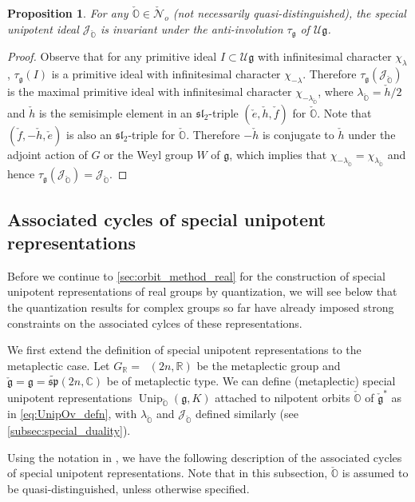 \documentclass[11pt, a4paper]{amsart}
\newcommand{\C}{\mathbb{C}}
\newcommand{\J}{\mathcal{J}}
\newcommand{\g}{\mathfrak{g}}
\newcommand{\orb}{\mathbb{O}}
\newcommand{\fg}{\mathfrak{g}}
\newcommand{\ckfg}{{\check{\fg}}}
\newcommand{\ckorb}{\check{\orb}}
\newcommand{\fmp}{\widetilde{\mathfrak{sp}}}
\newcommand{\cN}{\mathcal{N}}
\newcommand{\cJ}{\mathcal{J}}
\newcommand{\cU}{\mathcal{U}}
\newcommand{\Ug}{\cU\fg}
\DeclareMathOperator{\Unip}{Unip}
\DeclareMathOperator{\Mp}{\widetilde{Sp}}
\newcommand{\UnipOv}{\Unip_{\ckorb}}
\newcommand{\R}{\mathbb{R}}
\newcommand{\GR}{G_\R}
\newcommand{\slf}{\mathfrak{sl}}
\newtheorem{Prop}[Thm]{Proposition}
\theoremstyle{definition}
\numberwithin{equation}{section}
\begin{document}
\begin{Prop} \label{prop:J_tau_inv}
	For any $\ckorb \in \check{\cN}_o$ (not necessarily quasi-distinguished), the special unipotent ideal $\J_{\ckorb}$ is invariant under the anti-involution $\tau_\g$ of $\Ug$.
\end{Prop}

\begin{proof}
	Observe that for any primitive ideal $I \subset \Ug$ with infinitesimal character $\chi_\lambda$, $\tau_\g(I)$ is a primitive ideal with infinitesimal character $\chi_{-\lambda}$. Therefore $\tau_\g(\J_{\ckorb})$ is the maximal primitive ideal with infinitesimal character $\chi_{-\lambda_{\ckorb}}$, where $\lambda_{\ckorb} = \check{h}/2$ and $\check{h}$ is the semisimple element in an $\slf_2$-triple $(\check{e}, \check{h}, \check{f})$ for $\ckorb$. Note that $(\check{f}, -\check{h}, \check{e})$ is also an $\slf_2$-triple for $\ckorb$. Therefore $-\check{h}$ is conjugate to $\check{h}$ under the adjoint action of $G$ or the Weyl group $W$ of $\g$, which implies that $\chi_{-\lambda_{\ckorb}} = \chi_{\lambda_{\ckorb}}$ and hence $\tau_\g(\J_{\ckorb}) = \J_{\ckorb}$.
\end{proof}


\subsection{Associated cycles of special unipotent representations} \label{subsec:AC_special_unip}

Before we continue to \cref{sec:orbit_method_real} for the construction of special unipotent representations of real groups by quantization, we will see below that the quantization results for complex groups so far have already imposed strong constraints on the associated cylces of these representations.

We first extend the definition of special unipotent representations to the metaplectic case. Let $\GR = \Mp(2n,\R)$ be the metaplectic group and $\ckfg = \fg = \fmp(2n,\C)$ be of metaplectic type. We can define (metaplectic) special unipotent representations $\UnipOv(\g, K)$ attached to nilpotent orbits $\ckorb$ of $\ckfg^*$ as in \eqref{eq:UnipOv_defn}, with $\lambda_{\ckorb}$ and $\cJ_{\ckorb}$ defined similarly (see \cref{subsec:special_duality}). 

Using the notation in , we have the following description of the associated cycles of special unipotent representations. Note that in this subsection, $\ckorb$ is assumed to be quasi-distinguished, unless otherwise specified.
 
\end{document}

